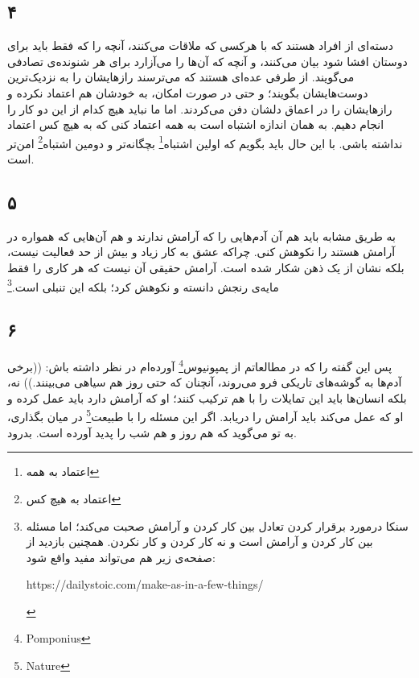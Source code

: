 \documentclass{article}
\begin{document}
    \subsection*{۴}
    دسته‌ای از افراد هستند که با هرکسی که ملاقات می‌کنند، آنچه را که فقط باید برای دوستان افشا شود بیان می‌کنند، و آنچه که آن‌ها را می‌آزارد برای هر شنونده‌ی تصادفی می‌گویند.
    از طرفی عده‌ای هستند که می‌ترسند رازهایشان را به نزدیک‌ترین دوست‌هایشان بگویند؛ و حتی در صورت امکان، به خودشان هم اعتماد نکرده و رازهایشان را در اعماق دلشان دفن می‌کردند.
    اما ما نباید هیچ کدام از این دو کار را انجام دهیم.
    به همان اندازه اشتباه است به همه اعتماد کنی که به هیچ کس اعتماد نداشته باشی.
    با این حال باید بگویم که اولین اشتباه\footnote{اعتماد به همه} بچگانه‌تر و دومین اشتباه\footnote{اعتماد به هیچ کس} امن‌تر است.
    \subsection*{۵}
    به طریق مشابه باید هم آن آدم‌هایی را که آرامش ندارند و هم آن‌هایی که همواره در آرامش هستند را نکوهش کنی.
    چراکه عشق به کار زیاد و بیش از حد فعالیت نیست، بلکه نشان از یک ذهن شکار شده است.
    آرامش حقیقی آن نیست که هر کاری را فقط مایه‌ی رنجش دانسته و نکوهش کرد؛ بلکه این تنبلی است.\footnote{سنکا درمورد برقرار کردن تعادل بین کار کردن و آرامش صحبت می‌کند؛ اما مسئله بین کار کردن و آرامش است و نه کار کردن و کار نکردن. همچنین بازدید از صفحه‌ی زیر هم می‌تواند مفید واقع شود:\newline \begin{LTR}https://dailystoic.com/make-as-in-a-few-things/\end{LTR}}
    \subsection*{۶}
    پس این گفته را که در مطالعاتم از پمپونیوس\footnote{Pomponius} آورده‌ام در نظر داشته باش: ((برخی آدم‌ها به گوشه‌های تاریکی فرو می‌روند، آنچنان که حتی روز هم سیاهی می‌بینند.))
    نه، بلکه انسان‌ها باید این تمایلات را با هم ترکیب کنند؛ او که آرامش دارد باید عمل کرده و او که عمل می‌کند باید آرامش را دریابد.
    اگر این مسئله را با طبیعت\footnote{Nature} در میان بگذاری،‌ به تو می‌گوید که هم روز و هم شب را پدید آورده است.
    بدرود.
\end{document}
